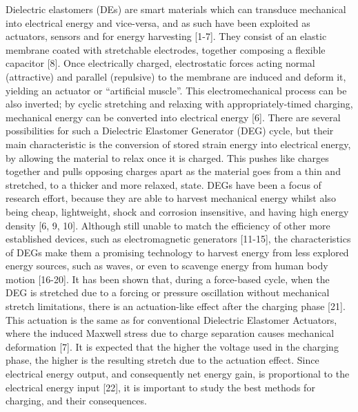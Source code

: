 Dielectric elastomers (DEs) are smart materials which can transduce mechanical into electrical energy and vice-versa, and as such have been exploited as actuators, sensors and for energy harvesting [1-7]. They consist of an elastic membrane coated with stretchable electrodes, together composing a flexible capacitor [8]. Once electrically charged, electrostatic forces acting normal (attractive) and parallel (repulsive) to the membrane are induced and deform it, yielding an actuator or “artificial muscle”. This electromechanical process can be also inverted; by cyclic stretching and relaxing with appropriately-timed charging, mechanical energy can be converted into electrical energy [6]. There are several possibilities for such a Dielectric Elastomer Generator (DEG) cycle, but their main characteristic is the conversion of stored strain energy into electrical energy, by allowing the material to relax once it is charged. This pushes like charges together and pulls opposing charges apart as the material goes from a thin and stretched, to a thicker and more relaxed, state. 
DEGs have been a focus of research effort, because they are able to harvest mechanical energy whilst also being cheap, lightweight, shock and corrosion insensitive, and having high energy density [6, 9, 10]. Although still unable to match the efficiency of other more established devices, such as electromagnetic generators [11-15], the characteristics of DEGs make them a promising technology to harvest energy from less explored energy sources, such as waves, or even to scavenge energy from human body motion [16-20]. 
It has been shown that, during a force-based cycle, when the DEG is stretched due to a forcing or pressure oscillation without mechanical stretch limitations, there is an actuation-like effect after the charging phase [21]. This actuation is the same as for conventional Dielectric Elastomer Actuators, where the induced Maxwell stress due to charge separation causes mechanical deformation [7]. It is expected that the higher the voltage used in the charging phase, the higher is the resulting stretch due to the actuation effect. Since electrical energy output, and consequently net energy gain, is proportional to the electrical energy input [22], it is important to study the best methods for charging, and their consequences.

